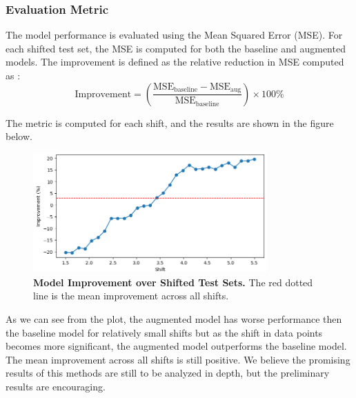 \subsubsection{Evaluation Metric}
The model performance is evaluated using the Mean Squared Error (MSE). For each shifted test set, the MSE is computed for both the baseline and augmented models.
The improvement is defined as the relative reduction in MSE computed as :
\begin{equation}
    \text{Improvement} = \left(\frac{\text{MSE}_{\text{baseline}} - \text{MSE}_{\text{aug}}}{\text{MSE}_{\text{baseline}}}\right) \times 100\%
\end{equation}

The metric is computed for each shift, and the results are shown in the figure below.
\begin{figure}[H]
    \centering
    \includegraphics[width=0.8\textwidth]{assets/reg_exp_improvement.png} 
    \caption{\textbf{Model Improvement over Shifted Test Sets.} The red dotted line is the mean improvement across all shifts.}
    \label{fig:improv-plot}
\end{figure}

As we can see from the plot, the augmented model has worse performance then the baseline model for relatively small shifts but as the shift in data points becomes more significant, the augmented model outperforms the baseline model. The mean improvement across all shifts is still positive.
We believe the promising results of this methods are still to be analyzed in depth, but the preliminary results are encouraging.
